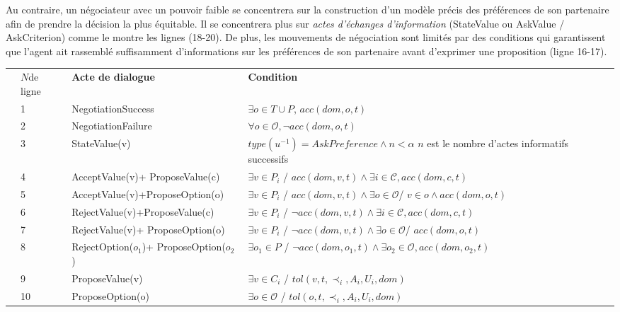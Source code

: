 	Au contraire, un négociateur avec un pouvoir faible se concentrera sur la construction d'un modèle précis des préférences de son partenaire afin de prendre la décision la plus équitable. Il se concentrera plus sur \emph {actes d'échanges d'information} (StateValue ou AskValue / AskCriterion) comme le montre les lignes (18-20). De plus, les mouvements de négociation sont limités par des conditions qui garantissent que l'agent ait rassemblé suffisamment d'informations sur les préférences de son partenaire avant d'exprimer une proposition (ligne 16-17).
	
	\begin{table}[!t]
		
		\centering
		\begin{tabular}{|p{.5cm}|p{.9cm}|p{4cm}|p{7.5cm}|}
			\hline
			\parbox[t]{3mm}{}&$N $de ligne& \textbf{Acte de dialogue} & \textbf{Condition} \\
			&1&NegotiationSuccess & $\exists o \in T\cup P$, $acc(dom,o,t)$ \\
			& 2& NegotiationFailure & $ \forall o \in \mathcal{O},  \neg acc(dom,o,t)$\\
			&3& StateValue(v) & $type(u^{-1}) = AskPreference \land n < \alpha$ \newline $n$ est le nombre d'actes informatifs successifs\\
			&4& AcceptValue(v)+ \newline ProposeValue(c) & $ \exists v \in P_i$ / $acc(dom,v,t) \land \exists i\in\mathcal{C}, acc(dom,c,t)$ \\
			&5& AcceptValue(v)+\newline ProposeOption(o) &  $ \exists v \in P_i$ / $ acc(dom,v,t) \land \exists o \in \mathcal{O}$/ $ v \in o \land acc(dom,o,t)$ \\
			&6& RejectValue(v)+\newline ProposeValue(c) & $ \exists v \in P_i$ / $ \neg acc(dom,v,t) \land \exists i\in\mathcal{C}, acc(dom,c,t)$ \\
			&7& RejectValue(v)+ \newline ProposeOption(o) &  $ \exists v \in P_i$ / $  \neg acc(dom,v,t) \land \exists o \in \mathcal{O}$/ $acc(dom,o,t)$ \\
			& 8&RejectOption($o_1$)+ ProposeOption($o_2$) & $ \exists o_1 \in P$ / $ \neg acc(dom,o_1,t) \land \exists o_2\in\mathcal{O}, acc(dom,o_2,t)$ \\
			&9& ProposeValue(v) & $\exists v \in C_i$ / $tol(v, t, \prec_i, A_i, U_i, dom)$\\
			&10& ProposeOption(o) & $\exists o \in \mathcal{O}$ / $tol(o, t, \prec_i, A_i, U_i, dom)$\\
			

\end{tabular}
\end{table}
